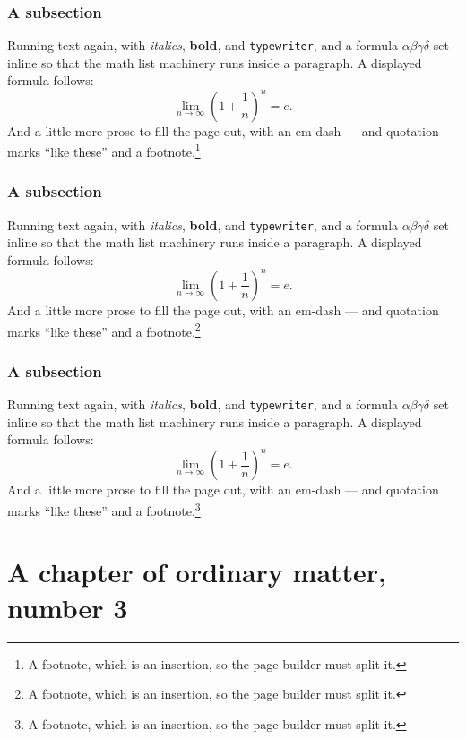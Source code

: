 \documentclass[11pt,a4paper]{report}
\theoremstyle{plain}
\begin{document}
\subsection{A subsection}
Running text again, with \textit{italics}, \textbf{bold}, and
\texttt{typewriter}, and a formula $\alpha\beta\gamma\delta$ set inline so
that the math list machinery runs inside a paragraph. A displayed formula
follows:
\[ \lim_{n\to\infty}\left(1+\frac{1}{n}\right)^{n}=e . \]
And a little more prose to fill the page out, with an em-dash --- and
quotation marks ``like these'' and a footnote.\footnote{A footnote, which is
an insertion, so the page builder must split it.}
\subsection{A subsection}
Running text again, with \textit{italics}, \textbf{bold}, and
\texttt{typewriter}, and a formula $\alpha\beta\gamma\delta$ set inline so
that the math list machinery runs inside a paragraph. A displayed formula
follows:
\[ \lim_{n\to\infty}\left(1+\frac{1}{n}\right)^{n}=e . \]
And a little more prose to fill the page out, with an em-dash --- and
quotation marks ``like these'' and a footnote.\footnote{A footnote, which is
an insertion, so the page builder must split it.}
\subsection{A subsection}
Running text again, with \textit{italics}, \textbf{bold}, and
\texttt{typewriter}, and a formula $\alpha\beta\gamma\delta$ set inline so
that the math list machinery runs inside a paragraph. A displayed formula
follows:
\[ \lim_{n\to\infty}\left(1+\frac{1}{n}\right)^{n}=e . \]
And a little more prose to fill the page out, with an em-dash --- and
quotation marks ``like these'' and a footnote.\footnote{A footnote, which is
an insertion, so the page builder must split it.}
\chapter{A chapter of ordinary matter, number 3}
\end{document}
